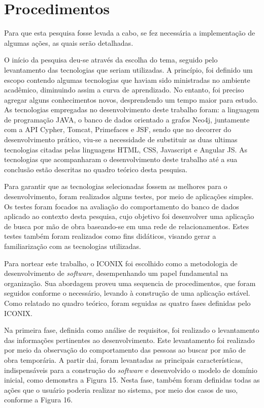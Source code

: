 \section{Procedimentos}

\par Para que esta pesquisa fosse levada a cabo, se fez necessária a implementação de algumas ações, as quais serão detalhadas.

\par O início da pesquisa deu-se através da escolha do tema, seguido pelo levantamento das tecnologias que seriam utilizadas. A princípio, foi definido um escopo contendo algumas tecnologias que haviam sido ministradas no ambiente acadêmico, diminuindo assim a curva de aprendizado. No entanto, foi preciso agregar alguns conhecimentos novos, desprendendo um tempo maior para estudo. As tecnologias empregadas no desenvolvimento deste trabalho foram: a linguagem de programação JAVA, o banco de dados orientado a grafos Neo4j, juntamente com a API Cypher, Tomcat, Primefaces e JSF, sendo que no decorrer do desenvolvimento prático, viu-se a necessidade de substituir as duas ultimas tecnologias citadas pelas linguagens HTML, CSS, Javascript e Angular JS. As tecnologias que acompanharam o desenvolvimento deste trabalho até a sua conclusão estão descritas no quadro teórico desta pesquisa.

\par Para garantir que as tecnologias selecionadas fossem as melhores para o desenvolvimento, foram realizados alguns testes, por meio de aplicações simples. Os testes foram focados na avaliação do comportamento do banco de dados aplicado ao contexto desta pesquisa, cujo objetivo foi desenvolver uma aplicação de busca por mão de obra baseando-se em uma rede de relacionamentos. Estes testes também foram realizados como fins didáticos, visando gerar a familiarização com as tecnologias utilizadas.

\par Para nortear este trabalho, o ICONIX foi escolhido como a metodologia de desenvolvimento de \textit{software}, desempenhando um papel fundamental na organização. Sua abordagem proveu uma sequencia de procedimentos, que foram seguidos conforme o necessário, levando à construção de uma aplicação estável. Como relatado no quadro teórico, foram seguidas as quatro fases definidas pelo ICONIX.

\par Na primeira fase, definida como análise de requisitos, foi realizado o levantamento das informações pertinentes ao desenvolvimento. Este levantamento foi realizado por meio da observação do comportamento das pessoas ao buscar por mão de obra temporária. A partir dai, foram levantadas as principais características, indispensáveis para a construção do \textit{software} e desenvolvido o modelo de domínio inicial, como demonstra a Figura 15. Nesta fase, também foram definidas todas as ações que o usuário poderia realizar no sistema, por meio dos casos de uso, conforme a Figura 16.

